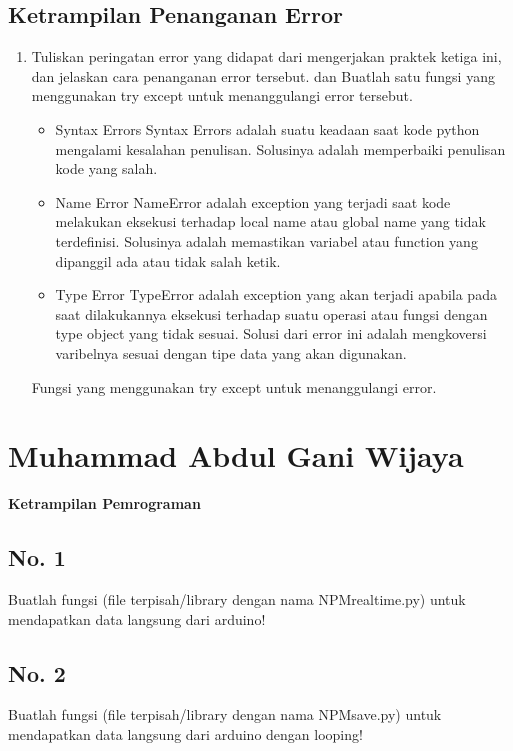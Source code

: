 \subsection{Ketrampilan Penanganan Error}
\begin{enumerate}
    \item Tuliskan  peringatan  error  yang  didapat  dari  mengerjakan  praktek ketiga  ini, dan  jelaskan  cara  penanganan  error  tersebut.   dan  Buatlah  satu fungsi  yang menggunakan try except untuk menanggulangi error tersebut.
\begin{itemize}
	\item Syntax Errors
	Syntax Errors adalah suatu keadaan saat kode python mengalami kesalahan penulisan. Solusinya adalah memperbaiki penulisan kode yang salah.
	
	\item Name Error
	NameError adalah exception yang terjadi saat kode melakukan eksekusi terhadap local name atau global name yang tidak terdefinisi. Solusinya adalah memastikan variabel atau function yang dipanggil ada atau tidak salah ketik.
	
	\item Type Error
	TypeError adalah exception yang akan terjadi apabila pada saat dilakukannya eksekusi terhadap suatu operasi atau fungsi dengan type object yang tidak sesuai. Solusi dari error ini adalah mengkoversi varibelnya sesuai dengan tipe data yang akan digunakan.
\end{itemize}
\par Fungsi yang menggunakan try except untuk menanggulangi error.

\end{enumerate}
\section{Muhammad Abdul Gani Wijaya}
{\Large \textbf{Ketrampilan Pemrograman}}
\subsection{No. 1}
Buatlah  fungsi  (file  terpisah/library  dengan  nama  NPMrealtime.py)  untuk mendapatkan data langsung dari arduino!




\subsection{No. 2}
Buatlah fungsi (file terpisah/library dengan nama NPMsave.py) untuk mendapatkan data langsung dari arduino dengan looping!

